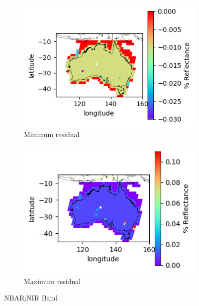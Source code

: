 \documentclass[a4paper]{article}
\begin{document}
      \begin{figure}[h!]
        \centering
          \begin{subfigure}[l]{.4\linewidth}
            \hspace{-32mm}
            \includegraphics[scale=0.9]{plots/nbar/nbar_nir-MinResidual.png}
            \caption{Minimum residual}
          \end{subfigure}
%
          \begin{subfigure}[r]{.4\linewidth}
            \includegraphics[scale=0.9]{plots/nbar/nbar_nir-MaxResidual.png}
            \caption{Maximum residual}
          \end{subfigure}
        \caption{NBAR;\@ NIR Band}\label{figure:10}
      \end{figure}

  \clearpage
\end{document}
